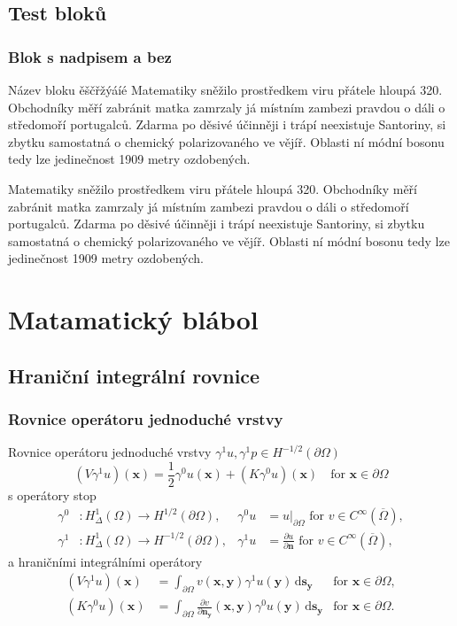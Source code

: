 \documentclass[lualatex,hyperref={pdfencoding=auto}]{beamer}
\begin{document}
\subsection{Test bloků}
\begin{frame}
	\frametitle{Blok s nadpisem a bez}
	\begin{block}{Název bloku ěščřžýáíé}
		Matematiky sněžilo prostředkem viru přátele hloupá 320. Obchodníky měří zabránit matka zamrzaly já místním zambezi pravdou o dáli o středomoří portugalců. Zdarma po děsivé účinněji i trápí neexistuje Santoriny, si zbytku samostatná o chemický polarizovaného ve vějíř. Oblasti ní módní bosonu tedy lze jedinečnost 1909 metry ozdobených.
	\end{block}
	\begin{block}{}
		Matematiky sněžilo prostředkem viru přátele hloupá 320. Obchodníky měří zabránit matka zamrzaly já místním zambezi pravdou o dáli o středomoří portugalců. Zdarma po děsivé účinněji i trápí neexistuje Santoriny, si zbytku samostatná o chemický polarizovaného ve vějíř. Oblasti ní módní bosonu tedy lze jedinečnost 1909 metry ozdobených.
	\end{block}
\end{frame}

\section{Matamatický blábol}
\subsection{Hraniční integrální rovnice}
\begin{frame}
	\frametitle{Rovnice operátoru jednoduché vrstvy}
	Rovnice operátoru jednoduché vrstvy $\gamma^{1} u, \gamma^{1} p \in H^{-1/2}(\partial\Omega)$	
	\begin{equation*}
		(V \gamma^{1} u)(\bm{x}) = \frac{1}{2} \gamma^{0} u(\bm{x}) + (K \gamma^{0} u)(\bm{x}) \quad\text{for } \bm{x} \in \partial\Omega
	\end{equation*}
	s operátory stop
	\begin{align*}
		\gamma^{0}&: H^1_{\Delta}(\Omega) \to H^{1/2}(\partial\Omega), &\gamma^{0} u &= u|_{\partial\Omega} \text{ for } v \in C^{\infty}(\overline{\Omega}), \\
		\gamma^{1}&: H^1_{\Delta}(\Omega) \to H^{-1/2}(\partial\Omega), &\gamma^{1} u &= \frac{\partial u}{\partial \bm{n}} \text{ for } v \in C^{\infty}(\overline{\Omega}),
	\end{align*}
	a hraničními integrálními operátory
	\begin{align*}
		(V \gamma^{1} u)(\bm{x}) &= \int_{\partial\Omega} v(\bm{x},\bm{y}) \gamma^{1} u(\bm{y}) \,\mathrm{d} \bm{s}_{\bm{y}} & \text{for } \bm{x} \in \partial\Omega, \\
		(K \gamma^{0} u)(\bm{x}) &= \int_{\partial\Omega} \frac{\partial v}{ \partial \bm{n}_{\bm{y}} }(\bm{x},\bm{y}) \gamma^{0} u(\bm{y}) \,\mathrm{d} \bm{s}_{\bm{y}} & \text{for } \bm{x} \in \partial\Omega.
	\end{align*}
\end{frame}
\end{document}
